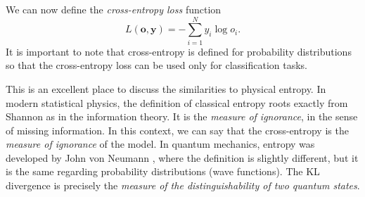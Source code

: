 We can now define the \emph{cross-entropy loss} function
\begin{equation}
    \label{eq:cross_entropy}
    L(\pmb{o},\pmb{y}) = - \sum_{i=1}^N y_i \log o_i.
\end{equation}
It is important to note that cross-entropy is defined for probability distributions so that the cross-entropy loss can be used only for classification tasks.

This is an excellent place to discuss the similarities to physical entropy.
In modern statistical physics, the definition of classical entropy roots exactly from Shannon \cite{shannon} as in the information theory.
It is the \emph{measure of ignorance}, in the sense of missing information.
In this context, we can say that the cross-entropy is the \emph{measure of ignorance} of the model.
In quantum mechanics, entropy was developed by John von Neumann \cite{VonNeumann}, where the definition is slightly different, but it is the same regarding probability distributions (wave functions).
The KL divergence is precisely the \emph{measure of the distinguishability of two quantum states}.



